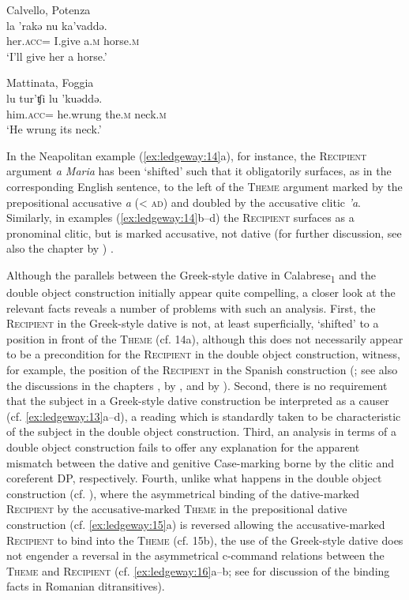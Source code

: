 \documentclass[output=paper,modfonts,nonflat,colorlinks,citecolor=brown]{langsci/langscibook}
\begin{document}
\ex Calvello, Potenza\\
        \gll la  {}'rakǝ  nu  ka'vaddǝ.\\
    her.\textsc{acc}=  I.give  a.\textsc{m}  horse.\textsc{m}\\
    \glt `I’ll give her a horse.'

\ex Mattinata, Foggia\\
    \gll lu  tur'ʧi  lu  {}'kuǝddǝ.\\
    him.\textsc{acc}=  he.wrung  the.\textsc{m}  neck.\textsc{m}\\
    \glt `He wrung its neck.'
    \z
    \z

In the Neapolitan example (\ref{ex:ledgeway:14}a), for instance, the \textsc{Recipient} argument \textit{a Maria} has been `shifted' such that it obligatorily surfaces, as in the corresponding English sentence, to the left of the \textsc{Theme} argument marked by the prepositional accusative \textit{a} ({\textless} \textsc{ad}) and doubled by the accusative clitic \textit{’a}. Similarly, in examples (\ref{ex:ledgeway:14}b--d) the \textsc{Recipient} surfaces as a pronominal clitic, but is marked accusative, not dative (for further discussion, see also the chapter by ) .

Although the parallels between the Greek-style dative in Calabrese\textsubscript{1} and the double object construction initially appear quite compelling, a closer look at the relevant facts reveals a number of problems with such an analysis. First, the \textsc{Recipient} in the Greek-style dative is not, at least superficially, `shifted' to a position in front of the \textsc{Theme} (cf. 14a), although this does not necessarily appear to be a precondition for the \textsc{Recipient} in the double object construction, witness, for example, the position of the \textsc{Recipient} in the Spanish construction (\citealt{Demonte1995}; see also the discussions in the chapters , by , and by ). Second, there is no requirement that the subject in a Greek-style dative construction be interpreted as a causer (cf. \ref{ex:ledgeway:13}a--d), a reading which is standardly taken to be characteristic of the subject in the double object construction. Third, an analysis in terms of a double object construction fails to offer any explanation for the apparent mismatch between the dative and genitive Case-marking borne by the clitic and coreferent DP, respectively. Fourth, unlike what happens in the double object construction (cf. \citealt{BarssLasnik1986,Larson1988}), where the asymmetrical binding of the dative-marked \textsc{Recipient} by the accusative-marked \textsc{Theme} in the prepositional dative construction (cf. \ref{ex:ledgeway:15}a) is reversed allowing the accusative-marked \textsc{Recipient} to bind into the \textsc{Theme} (cf. 15b), the use of the Greek-style dative does not engender a reversal in the asymmetrical c-command relations between the \textsc{Theme} and \textsc{Recipient} (cf. \ref{ex:ledgeway:16}a--b; see  for discussion of the binding facts in Romanian ditransitives).
\end{document}
